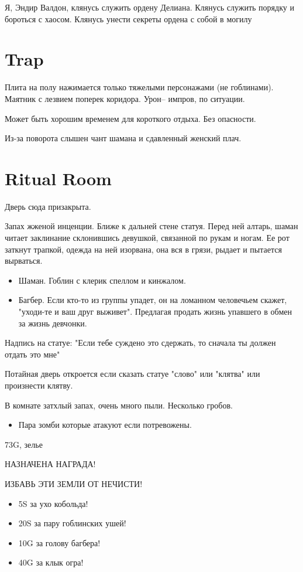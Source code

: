 \documentclass[a5paper,11pt]{book}
\begin{document}
\begin{framed}
Я, Эндир Валдон, клянусь служить ордену Делиана. Клянусь служить порядку и бороться с хаосом. Клянусь унести секреты ордена с собой в могилу
\end{framed}

\section{Trap}
Плита на полу нажимается только тяжелыми персонажами (не гоблинами). Маятник с лезвием поперек коридора. Урон-- импров, по ситуации.

Может быть хорошим временем для короткого отдыха. Без опасности.

Из-за поворота слышен чант шамана и сдавленный женский плач.

\section{Ritual Room}
Дверь сюда призакрыта.

Запах жженой инценции. Ближе к дальней стене статуя. Перед ней алтарь, шаман читает заклинание склонившись девушкой, связанной по рукам и ногам. Ее рот заткнут трапкой, одежда на ней изорвана, она вся в грязи, рыдает и пытается вырваться.

\begin{itemize}
  \item Шаман. Гоблин с клерик спеллом и кинжалом.
  \item Багбер. Если кто-то из группы упадет, он на ломанном человечьем скажет, "уходи-те и ваш друг выживет". Предлагая продать жизнь упавшего в обмен за жизнь девчонки.
\end{itemize}

\begin{framed}
Надпись на статуе: "Если тебе суждено это сдержать, то сначала ты должен отдать это мне"
\end{framed}

Потайная дверь откроется если сказать статуе "слово" или "клятва" или произнести клятву.

В комнате затхлый запах, очень много пыли. Несколько гробов.

\begin{itemize}
  \item Пара зомби которые атакуют если потревожены.
\end{itemize}

73G, зелье

\clearpage

\begin{framed}
\begin{center}
НАЗНАЧЕНА НАГРАДА!

ИЗБАВЬ ЭТИ ЗЕМЛИ ОТ НЕЧИСТИ!
\begin{itemize}[leftmargin=9em]
  \item 5S за ухо кобольда!
  \item 20S за пару гоблинских ушей!
  \item 10G за голову багбера!
  \item 40G за клык огра!
\end{itemize}
\end{center}
\end{framed}
\end{document}
